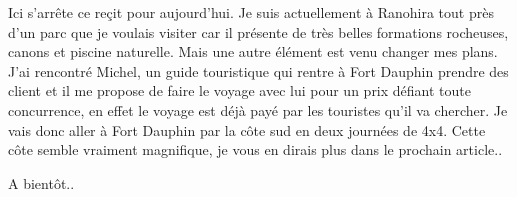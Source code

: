 \begin{multicols}{2}

Ici s'arrête ce reçit pour aujourd'hui. Je suis actuellement à Ranohira tout près d'un parc que je voulais visiter car il présente de très belles formations rocheuses, canons et piscine naturelle. Mais une autre élément est venu changer mes plans. J'ai rencontré Michel, un guide touristique qui rentre à Fort Dauphin prendre des client et il me propose de faire le voyage avec lui pour un prix défiant toute concurrence, en effet le voyage est déjà payé par les touristes qu'il va chercher. Je vais donc aller à Fort Dauphin par la côte sud en deux journées de 4x4. Cette côte semble vraiment magnifique, je vous en dirais plus dans le prochain article..

A bientôt..

\end{multicols}
